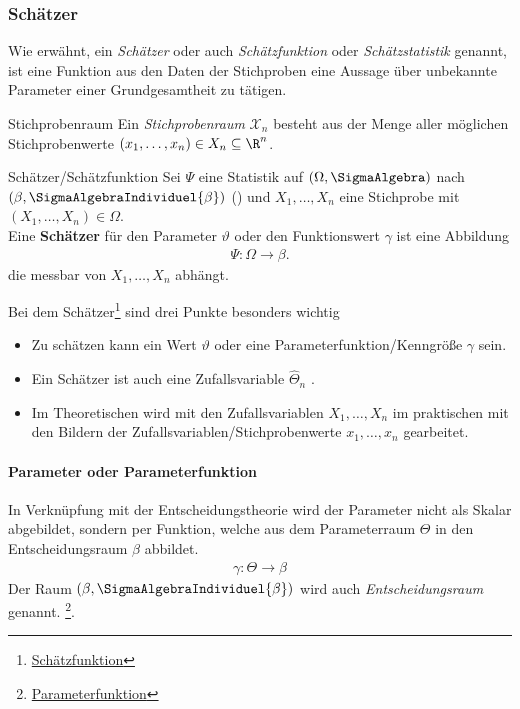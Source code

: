 \subsubsection{Schätzer}

Wie erwähnt, ein \textit{Schätzer} oder auch \textit{Schätzfunktion} oder \textit{Schätzstatistik} genannt, ist eine Funktion aus den Daten der Stichproben eine Aussage über unbekannte Parameter einer Grundgesamtheit zu tätigen.\\

\begin{Lemma-Definition}{Stichprobenraum}
Ein \textit{Stichprobenraum} $\mathcal{X}_n$ besteht aus der Menge aller möglichen Stichprobenwerte $\left(x_1, \dots, x_n\right)\in X_n \subseteq \R^n$.
\end{Lemma-Definition}

\begin{Definition}{Schätzer/Schätzfunktion}
Sei $\Psi$ eine Statistik auf $\left(\Omega, \SigmaAlgebra\right)$ nach $\left(\beta, \SigmaAlgebraIndividuel{\beta}\right)$ () und $X_1,\dots, X_n$ eine Stichprobe mit $(X_1,\dots,X_n)\in \Omega$. \\
Eine \textbf{Schätzer} für den Parameter $\vartheta$ oder den Funktionswert $\gamma$ ist eine Abbildung 
\begin{align}
	\Psi: \Omega \rightarrow \beta.
\end{align}
die messbar von $X_1,\dots,X_n$ abhängt.
\end{Definition}

Bei dem Schätzer\footnote{\href{https://de.wikipedia.org/wiki/Schätzfunktion}{Schätzfunktion}} sind drei Punkte besonders wichtig
\begin{itemize}
	\item Zu schätzen kann ein Wert $\vartheta$ oder eine Parameterfunktion/Kenngröße $\gamma$ sein.
	\item Ein Schätzer ist auch eine Zufallsvariable $\hat{\Theta}_n$ .
	\item Im Theoretischen wird mit den Zufallsvariablen $X_1,\dots,X_n$ im praktischen mit den Bildern der Zufallsvariablen/Stichprobenwerte $x_1,\dots,x_n$ gearbeitet.
\end{itemize}

\paragraph{Parameter oder Parameterfunktion}
In Verknüpfung mit der Entscheidungstheorie wird der Parameter nicht als Skalar abgebildet, sondern per Funktion, welche aus dem Parameterraum $\Theta$ in den Entscheidungsraum $\beta$ abbildet.
\begin{align}
	\gamma: \Theta \rightarrow \beta
\end{align}
Der Raum $\left(\beta, \SigmaAlgebraIndividuel{\beta}\right)$ wird auch \textit{Entscheidungsraum} genannt. \footnote{\href{https://de.wikipedia.org/wiki/Parameterfunktion{\_}(Statistik)}{Parameterfunktion}}.

